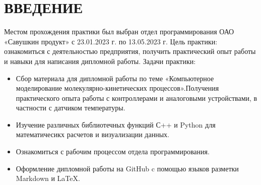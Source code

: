 \chapter*{ВВЕДЕНИЕ}
\label{ch:intro}
Местом прохождения практики был выбран отдел программирования ОАО «Савушкин продукт» с 23.01.2023 г. по 13.05.2023 г.
Цель практики: ознакомиться с деятельностью предприятия, получить практический опыт работы и навыки для написания дипломной работы.
Задачи практики:
\begin{itemize}
        \item Сбор материала для дипломной работы по теме «Компьютерное моделирование молекулярно-кинетических процессов».Получения практического опыта работы с контроллерами и аналоговыми устройствами, в частности с датчиком температуры.
        \item  Изучение различных библиотечных функций С++ и Python для математичесикх расчетов и визуализации данных.
        \item Ознакомиться с рабочим процессом отдела программирования.
        \item Оформление дипломной работы на GitHub c помощью языков разметки Markdown и \LaTeX .
    \end{itemize}

\endinput
